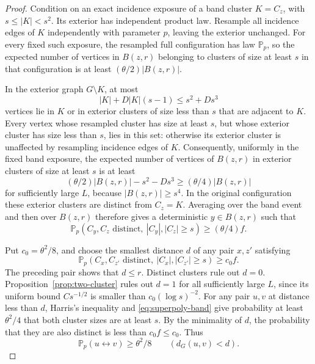 \documentclass[11pt]{article}
\theoremstyle{definition}
\begin{document}
\begin{proof}
Condition on an exact incidence exposure of a band cluster
$K=C_z$, with $s\le|K|<s^2$. Its exterior has independent product law.
Resample all incidence edges of $K$ independently with parameter $p$,
leaving the exterior unchanged. For every fixed such exposure, the
resampled full configuration has law $\mathbb P_p$, so the expected number
of vertices in $B(z,r)$ belonging to clusters of size at least $s$
in that configuration is at least
$(\theta/2)|B(z,r)|$.

In the exterior graph $G\setminus K$, at most
\[
 |K|+D|K|(s-1)\le s^2+Ds^3
\]
vertices lie in $K$ or in exterior clusters of size less than $s$
that are adjacent to $K$. Every vertex whose resampled cluster has
size at least $s$, but whose exterior cluster has size less than $s$,
lies in this set: otherwise its exterior cluster is unaffected by
resampling incidence edges of $K$. Consequently, uniformly in the
fixed band exposure, the expected number of vertices of $B(z,r)$
in exterior clusters of size at least $s$ is at least
\[
 (\theta/2)|B(z,r)|-s^2-Ds^3
 \ge(\theta/4)|B(z,r)|
\]
for sufficiently large $L$, because $|B(z,r)|\ge s^4$.
In the original configuration these exterior clusters are distinct
from $C_z=K$. Averaging over the band event and then over $B(z,r)$
therefore gives a deterministic $y\in B(z,r)$ such that
\[
 \mathbb P_p(C_y,C_z\text{ distinct},\ |C_y|,|C_z|\ge s)
 \ge(\theta/4)f.
\]

Put $c_0=\theta^2/8$, and choose the smallest distance $d$ of any pair
$x,z'$ satisfying
\begin{equation}\label{eq:superpoly-separated-pair}
 \mathbb P_p(C_x,C_{z'}\text{ distinct},\ |C_x|,|C_{z'}|\ge s)
 \ge c_0 f.
\end{equation}
The preceding pair shows that $d\le r$. Distinct clusters rule out
$d=0$. Proposition~\ref{prop:two-cluster} rules out $d=1$ for all
sufficiently large $L$, since its uniform bound $Cs^{-1/2}$ is smaller
than $c_0(\log s)^{-2}$.
For any pair $u,v$ at distance less than $d$, Harris's inequality and
\eqref{eq:superpoly-band} give probability at least $\theta^2/4$ that
both cluster sizes are at least $s$. By the minimality of $d$, the
probability that they are also distinct is less than $c_0f\le c_0$.
Thus
\begin{equation}\label{eq:superpoly-short-connections}
 \mathbb P_p(u\leftrightarrow v)\ge\theta^2/8
 \qquad(d_G(u,v)<d).
\end{equation}


\end{proof}
\end{document}
